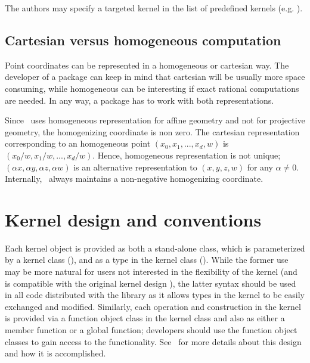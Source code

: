 The authors may specify a targeted kernel in the list of predefined
kernels
(e.g.  ).

\subsection{Cartesian versus homogeneous
  computation\label{sec:CartesianHomogeneousComputation}}

Point coordinates can be represented in a homogeneous or cartesian
way.
The developer of a package can keep in mind that cartesian will be
usually more space consuming, while homogeneous can be interesting if
exact rational computations are needed.
In any way, a package has to work with both representations.


Since \cgal\ uses homogeneous representation for affine geometry  and not
for projective geometry, the homogenizing coordinate  is non zero.
The cartesian 
representation corresponding to an homogeneous point
$(x_0,x_1,...,x_d,w)$ is
$(x_0/w,x_1/w,...,x_d/w)$. Hence, homogeneous representation is not unique;
$(\alpha x,\alpha y,\alpha z,\alpha w)$ is an alternative
representation to $(x,y,z,w)$  for any $\alpha\neq 0$. 
Internally, \cgal\ always maintains a non-negative homogenizing coordinate.




\section{Kernel design and conventions}
%
%
Each kernel object is provided as both a stand-alone class, which is 
parameterized by a kernel class (), and as a type 
in the kernel class ().  While the former use may
be more natural for users not interested in the flexibility of the kernel
(and is compatible with the original kernel design \cite{fgkss-dccga-00}), the
latter syntax should be used in all code distributed with the library
as it allows types in the kernel to be easily exchanged and modified.
Similarly, each operation and construction in the kernel is provided via 
a function object class in the 
kernel class and also as either a member function or a global function; 
developers should use the function object classes to gain access to the
functionality.  See~\cite{hhkps-aegk-01} for more details about this 
design and how it is accomplished.

